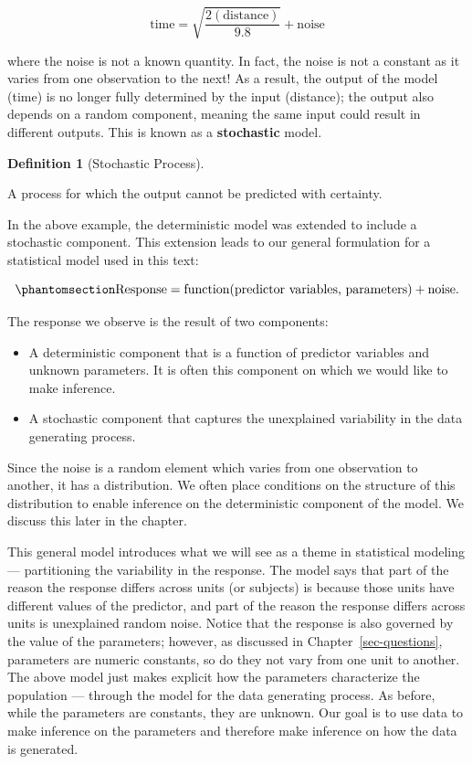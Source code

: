 \documentclass[
  letterpaper,
  DIV=11,
  numbers=noendperiod]{scrreprt}
\providecommand{\tightlist}{%
  \setlength{\itemsep}{0pt}\setlength{\parskip}{0pt}}\usepackage{longtable,booktabs,array}
\theoremstyle{plain}
\theoremstyle{definition}
\theoremstyle{definition}
\newtheorem{definition}{Definition}[chapter]
\theoremstyle{remark}
\begin{document}
\[\text{time} = \sqrt{\frac{2(\text{distance})}{9.8}} + \text{noise}\]

where the noise is not a known quantity. In fact, the noise is not a
constant as it varies from one observation to the next! As a result, the
output of the model (time) is no longer fully determined by the input
(distance); the output also depends on a random component, meaning the
same input could result in different outputs. This is known as a
\textbf{stochastic} model.

\begin{definition}[Stochastic
Process]\protect\hypertarget{def-stochastic-process}{}\label{def-stochastic-process}

A process for which the output cannot be predicted with certainty.

\end{definition}

In the above example, the deterministic model was extended to include a
stochastic component. This extension leads to our general formulation
for a statistical model used in this text:

\begin{equation}\phantomsection\label{eq-general-model}{
\text{Response} = \text{function}(\text{predictor variables, parameters}) + \text{noise}.
}\end{equation}

The response we observe is the result of two components:

\begin{itemize}
\tightlist
\item
  A deterministic component that is a function of predictor variables
  and unknown parameters. It is often this component on which we would
  like to make inference.
\item
  A stochastic component that captures the unexplained variability in
  the data generating process.
\end{itemize}

Since the noise is a random element which varies from one observation to
another, it has a distribution. We often place conditions on the
structure of this distribution to enable inference on the deterministic
component of the model. We discuss this later in the chapter.

This general model introduces what we will see as a theme in statistical
modeling --- partitioning the variability in the response. The model
says that part of the reason the response differs across units (or
subjects) is because those units have different values of the predictor,
and part of the reason the response differs across units is unexplained
random noise. Notice that the response is also governed by the value of
the parameters; however, as discussed in Chapter~\ref{sec-questions},
parameters are numeric constants, so do they not vary from one unit to
another. The above model just makes explicit how the parameters
characterize the population --- through the model for the data
generating process. As before, while the parameters are constants, they
are unknown. Our goal is to use data to make inference on the parameters
and therefore make inference on how the data is generated.
\end{document}
